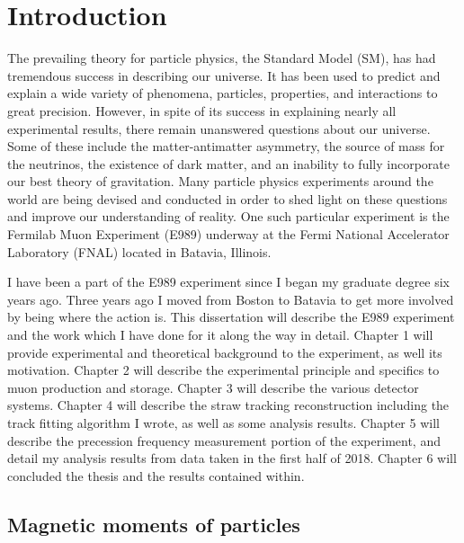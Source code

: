 
\thispagestyle{myheadings}
\graphicspath{{Body/Figures/Theory/}}

\chapter{Introduction}
\label{chapter:Introduction}

The prevailing theory for particle physics, the Standard Model (SM), has had tremendous success in describing our universe. It has been used to predict and explain a wide variety of phenomena, particles, properties, and interactions to great precision. However, in spite of its success in explaining nearly all experimental results, there remain unanswered questions about our universe. Some of these include the matter-antimatter asymmetry, the source of mass for the neutrinos, the existence of dark matter, and an inability to fully incorporate our best theory of gravitation. Many particle physics experiments around the world are being devised and conducted in order to shed light on these questions and improve our understanding of reality. One such particular experiment is the Fermilab Muon \gmtwo Experiment (E989) underway at the Fermi National Accelerator Laboratory (FNAL) located in Batavia, Illinois.

I have been a part of the E989 experiment since I began my graduate degree six years ago. Three years ago I moved from Boston to Batavia to get more involved by being where the action is. This dissertation will describe the E989 experiment and the work which I have done for it along the way in detail. Chapter 1 will provide experimental and theoretical background to the experiment, as well its motivation. Chapter 2 will describe the experimental principle and specifics to muon production and storage. Chapter 3 will describe the various detector systems. Chapter 4 will describe the straw tracking reconstruction including the track fitting algorithm I wrote, as well as some analysis results. Chapter 5 will describe the precession frequency measurement portion of the experiment, and detail my analysis results from data taken in the first half of 2018. Chapter 6 will concluded the thesis and the results contained within.


\section{Magnetic moments of particles}
\label{sec:MDMs}

